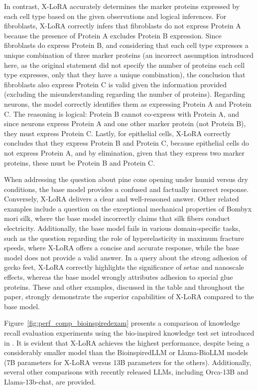In contrast, X-LoRA accurately determines the marker proteins expressed by each cell type based on the given observations and logical inferences. For fibroblasts, X-LoRA correctly infers that fibroblasts do not express Protein A because the presence of Protein A excludes Protein B expression. Since fibroblasts do express Protein B, and considering that each cell type expresses a unique combination of three marker proteins (an incorrect assumption introduced here, as the original statement did not specify the number of proteins each cell type expresses, only that they have a unique combination), the conclusion that fibroblasts also express Protein C is valid given the information provided (excluding the misunderstanding regarding the number of proteins). Regarding neurons, the model correctly identifies them as expressing Protein A and Protein C. The reasoning is logical: Protein B cannot co-express with Protein A, and since neurons express Protein A and one other marker protein (not Protein B), they must express Protein C. Lastly, for epithelial cells, X-LoRA correctly concludes that they express Protein B and Protein C, because epithelial cells do not express Protein A, and by elimination, given that they express two marker proteins, these must be Protein B and Protein C.

When addressing the question about pine cone opening under humid versus dry conditions, the base model provides a confused and factually incorrect response. Conversely, X-LoRA delivers a clear and well-reasoned answer. Other related examples include a question on the exceptional mechanical properties of Bombyx mori silk, where the base model incorrectly claims that silk fibers conduct electricity. Additionally, the base model fails in various domain-specific tasks, such as the question regarding the role of hyperelasticity in maximum fracture speeds, where X-LoRA offers a concise and accurate response, while the base model does not provide a valid answer. In a query about the strong adhesion of gecko feet, X-LoRA correctly highlights the significance of setae and nanoscale effects, whereas the base model wrongly attributes adhesion to special glue proteins. These and other examples, discussed in the table and throughout the paper, strongly demonstrate the superior capabilities of X-LoRA compared to the base model.

Figure~\ref{fig:perf_comp_bioinspiredexam} presents a comparison of knowledge recall evaluation experiments using the bio-inspired knowledge test set introduced in \cite{Luu2023BioinspiredLLM:Materials}. It is evident that X-LoRA achieves the highest performance, despite being a considerably smaller model than the BioinspiredLLM or Llama-BioLLM models (7B parameters for X-LoRA versus 13B parameters for the others). Additionally, several other comparisons with recently released LLMs, including Orca-13B and Llama-13b-chat, are provided.

